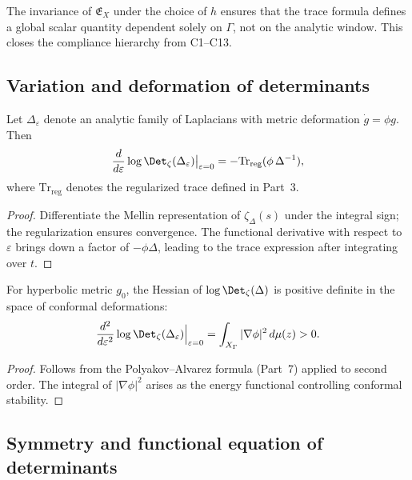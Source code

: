 \begin{invariant}
The invariance of $\mathfrak{E}_X$ under the choice of $h$ ensures that the trace formula defines a global scalar quantity dependent solely on $\Gamma$, not on the analytic window. This closes the compliance hierarchy from C1–C13. \relax
\end{invariant}

\subsection{Variation and deformation of determinants}
\label{subsec:ch4-part6-variation} \relax

\begin{proposition}
\label{prop:det-variation}
Let $\Delta_\varepsilon$ denote an analytic family of Laplacians with metric deformation $\dot g = \phi g$. Then
\[
\frac{d}{d\varepsilon}\log\Det_\zeta(\Delta_\varepsilon)
\big|_{\varepsilon=0}
= -\mathrm{Tr}_{\mathrm{reg}}(\phi\,\Delta^{-1}),
\]
where $\mathrm{Tr}_{\mathrm{reg}}$ denotes the regularized trace defined in Part~3. \relax
\end{proposition}

\begin{proof}\relax
Differentiate the Mellin representation of $\zeta_\Delta(s)$ under the integral sign; the regularization ensures convergence. The functional derivative with respect to $\varepsilon$ brings down a factor of $-\phi\Delta$, leading to the trace expression after integrating over $t$. \relax
\end{proof}

\begin{theorem}
\label{thm:second-variation}
For hyperbolic metric $g_0$, the Hessian of $\log\Det_\zeta(\Delta)$ is positive definite in the space of conformal deformations:
\[
\frac{d^2}{d\varepsilon^2}\log\Det_\zeta(\Delta_\varepsilon)\Big|_{\varepsilon=0}
= \int_{X_\Gamma} |\nabla\phi|^2\,d\mu(z) > 0.
\]
\end{theorem}

\begin{proof}\relax
Follows from the Polyakov–Alvarez formula (Part~7) applied to second order. The integral of $|\nabla\phi|^2$ arises as the energy functional controlling conformal stability. \relax
\end{proof}

\subsection{Symmetry and functional equation of determinants}
\label{subsec:ch4-part6-symmetry} \relax

